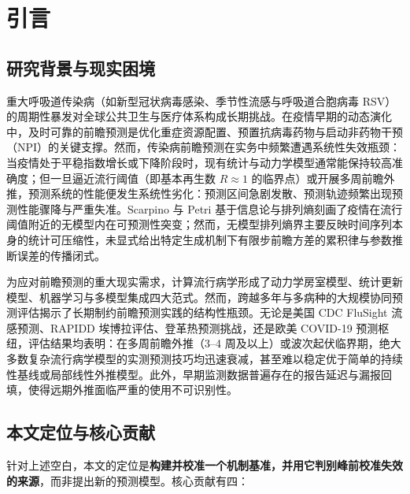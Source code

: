 \documentclass[10pt,UTF8,a4paper,zihao=-4]{ctexart}
\theoremstyle{plain}
\theoremstyle{definition}
\theoremstyle{remark}
\begin{document}
\vspace{0.4em}

\section{引言}\label{sec:intro}

\subsection{研究背景与现实困境}

重大呼吸道传染病（如新型冠状病毒感染、季节性流感与呼吸道合胞病毒 RSV）的周期性暴发对全球公共卫生与医疗体系构成长期挑战。在疫情早期的动态演化中，及时可靠的前瞻预测是优化重症资源配置、预置抗病毒药物与启动非药物干预（NPI）的关键支撑。然而，传染病前瞻预测在实务中频繁遭遇系统性失效瓶颈：当疫情处于平稳指数增长或下降阶段时，现有统计与动力学模型通常能保持较高准确度；但一旦逼近流行阈值（即基本再生数 $R \approx 1$ 的临界点）或开展多周前瞻外推，预测系统的性能便发生系统性劣化：预测区间急剧发散、预测轨迹频繁出现预测性能骤降与严重失准\citep{reich2019collaborative}。Scarpino 与 Petri\citep{scarpino2019predictability} 基于信息论与排列熵刻画了疫情在流行阈值附近的无模型内在可预测性突变；然而，无模型排列熵界主要反映时间序列本身的统计可压缩性，未显式给出特定生成机制下有限步前瞻方差的累积律与参数推断误差的传播闭式。

为应对前瞻预测的重大现实需求，计算流行病学形成了动力学房室模型、统计更新模型、机器学习与多模型集成四大范式。然而，跨越多年与多病种的大规模协同预测评估揭示了长期制约前瞻预测实践的结构性瓶颈。无论是美国 CDC FluSight 流感预测\citep{mcgowan2019collaborative, flusight2024evaluation}、RAPIDD 埃博拉评估\citep{viboud2018rapidd}、登革热预测挑战\citep{johansson2019open}，还是欧美 COVID-19 预测枢纽\citep{cramer2022evaluation, sherratt2023europeanhubs}，评估结果均表明：在多周前瞻外推（3--4 周及以上）或波次起伏临界期，绝大多数复杂流行病学模型的实测预测技巧均迅速衰减，甚至难以稳定优于简单的持续性基线或局部线性外推模型\citep{suez2026baseline, lopez2024challenges}。此外，早期监测数据普遍存在的报告延迟与漏报回填，使得远期外推面临严重的使用不可识别性\citep{melikechi2022limits, king2015avoidable}。

\subsection{本文定位与核心贡献}\label{sec:contrib}

针对上述空白，本文的定位是\textbf{构建并校准一个机制基准，并用它判别峰前校准失效的来源}，而非提出新的预测模型。核心贡献有四：
\end{document}
